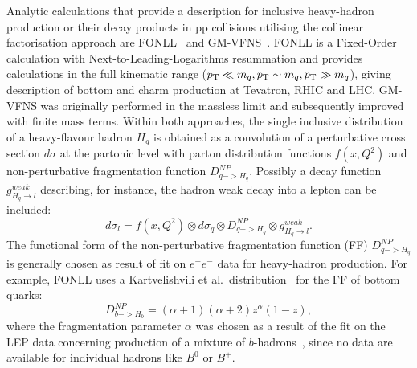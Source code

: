 Analytic calculations that provide a description for inclusive 
heavy-hadron production or their decay products
in pp collisions utilising the collinear factorisation approach 
are FONLL~\cite{Cacciari:1998it,Cacciari:2001td} 
and GM-VFNS~\cite{Kniehl:2004fy}. 
FONLL is a Fixed-Order calculation with Next-to-Leading-Logarithms 
resummation and provides calculations in the full kinematic range 
($p_{\rm T} \ll m_q, p_{\rm T} \sim m_q, p_{\rm T} \gg m_q$),
giving description of bottom and charm production at Tevatron, RHIC and LHC. 
GM-VFNS was originally performed in the massless limit 
and subsequently improved with finite mass terms.
Within both approaches, the single inclusive distribution of a 
heavy-flavour hadron $H_q$ is obtained as a convolution of a
perturbative cross section $d\sigma$ at the partonic level with 
parton distribution functions $f(x, Q^2)$ and non-perturbative 
fragmentation function $D^{NP}_{q->H_q}$.
Possibly a decay function $g^{weak}_{H_q \rightarrow l}$ 
describing, for instance, the hadron weak decay into a lepton can be included:
\begin{equation}
d\sigma_l = f(x, Q^2) \otimes d\sigma_{q} \otimes D^{NP}_{q->H_q} \otimes g^{weak}_{H_q \rightarrow l}.
\end{equation}
The functional form of the non-perturbative fragmentation 
function (FF) $D^{NP}_{q->H_q}$ 
is generally chosen as result of fit on $e^+e^-$ data for 
heavy-hadron production. For example, FONLL uses
a Kartvelishvili et al.~distribution~\cite{Kartvelishvili:1977pi} 
for the FF of bottom quarks:
\begin{equation}
D^{NP}_{b->H_b}= (\alpha +1 )(\alpha +2)z^{\alpha} (1-z),
\end{equation}
where the fragmentation parameter $\alpha$ was chosen as a 
result of the fit on the LEP data concerning production
of a mixture of $b$-hadrons~\cite{Cacciari:2005uk,Heister:2001jg,Abbiendi:2002vt}, 
since no data are available for individual hadrons like $B^0$ or $B^+$.
